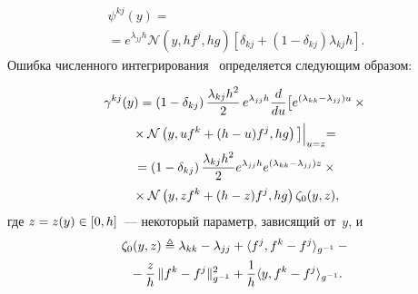 \begin{multicols}{2}
 \vspace*{-12pt}

\noindent
 \begin{multline}
\psi^{kj}(y)={}\\
{}=e^{\lambda_{jj}h}\mathcal{N}(y,hf^j,hg)
 \left[\delta_{kj}+(1-\delta_{kj})\lambda_{kj}h\right].
 \label{eq:psi_left_tr}
 \end{multline}
 Ошибка численного интегрирования~\cite{IK_94} определяется следующим образом:
 
 \noindent
 \begin{multline*} 
 \gamma^{kj}(y)=\left(1-\delta_{kj}\right)\displaystyle\frac{\displaystyle \lambda_{kj}h^2\mathstrut}{\displaystyle 2\mathstrut}\,
 e^{\lambda_{jj}h}\displaystyle\frac{\displaystyle d\mathstrut}{\displaystyle du\mathstrut}\big[
 e^{(\lambda_{kk}-\lambda_{jj})u}\times{}\\
 {}\times 
 \mathcal{N}\left(y,uf^k+(h-u)f^j,hg\right)
 \big]\Bigl|_{u=z} ={} \\ 
 {}=
 \left(1-\delta_{kj}\right)
 \displaystyle\frac{\displaystyle \lambda_{kj}h^2\mathstrut}{\displaystyle 2\mathstrut}e^{\lambda_{jj}h}
 e^{(\lambda_{kk}-\lambda_{jj})z}\times{}\\
 {}\times
 \mathcal{N}
 \left(y,zf^k+(h-z)f^j,hg\right) \zeta_0(y,z),
 \end{multline*}
 где $z = z (y) \hm\in [0,h]$~--- некоторый параметр, зависящий от~$y$, и
 \begin{multline} 
 \zeta_0(y,z) \triangleq \lambda_{kk}-\lambda_{jj}
 +\langle f^j,f^k-f^j\rangle_{g^{-1}}- {}\\
 {}-\displaystyle\frac{\displaystyle z\mathstrut}{\displaystyle h\mathstrut}\,
 \|f^k-f^j\|^2_{g^{-1}} + \displaystyle\frac{\displaystyle 1\mathstrut}{\displaystyle h\mathstrut}\langle y,f^k-f^j\rangle_{g^{-1}}.
 \label{eq:zeta_0_def}
 \end{multline}


\end{multicols}
